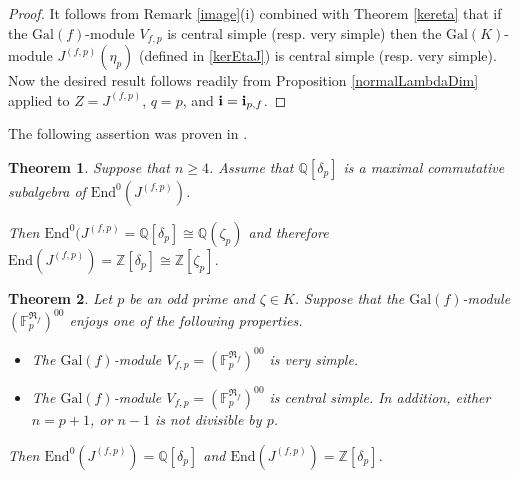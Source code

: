 \documentclass[12pt,a4paper,reqno]{amsart}
\def\Q{{\mathbb Q}}
\def\Z{{\mathbb Z}}
\def\R{{\mathbb R}}
\def\F{{\mathbb F}}
\def\R{{\mathfrak R}}
\def\CC{{\mathfrak C}}
\def\Gal{\mathrm{Gal}}
\def\Perm{\mathrm{Perm}}
\def\Alt{\mathrm{Alt}}
\def\End{\mathrm{End}}
\newtheorem{thm}{Theorem}[section]
\theoremstyle{definition}
\newtheorem{rem}[thm]{Remark}
\begin{document}
\begin{proof}
It follows from Remark \ref{image}(i) combined with Theorem \ref{kereta} that if the $\Gal(f)$-module  $V_{f,p}$ is central simple (resp. very simple) then
the $\Gal(K)$-module  $J^{(f,p)}(\eta_p)$  (defined in \eqref{kerEtaJ}) is central simple (resp. very simple). Now the desired result follows readily from
Proposition \ref{normalLambdaDim} applied to $Z=J^{(f,p)}$, $q=p$,  and ${\bf i}={\bf i}_{p,f}$.
\end{proof}
 







The following assertion was proven in \cite[Th. 3.6]{ZarhinCambridge}.


\begin{thm}
\label{Cambridge36}
Suppose that $n \ge 4$.  Assume that $\Q[\delta_p]$ is a maximal commutative subalgebra of
 $\End^0(J^{(f,p)})$. 
 
 Then  $\End^0(J^{(f,p)}=\Q[\delta_p]\cong \Q(\zeta_p)$ and therefore
 $\End(J^{(f,p)})=\Z[\delta_p]\cong \Z[\zeta_p]$.
\end{thm}






\begin{thm}
\label{handysup} Let $p$ be an odd prime and $\zeta \in K$. 
Suppose that the $\Gal(f)$-module $(\F_p^{\R_f})^{00}$
enjoys one of the following properties.

 
\begin{itemize}
\item[(i)]
The $\Gal(f)$-module $V_{f,p}=(\F_p^{\R_f})^{00}$  is very simple.
\item[(ii)]
The  $\Gal(f)$-module 
$V_{f,p}=(\F_p^{\R_f})^{00}$ is central simple.  In addition, 
either $n=p+1$, or $n-1$ is not divisible by $p$. 
\end{itemize}

  Then $\End^0(J^{(f,p)})=\Q[\delta_p]$ and $\End(J^{(f,p)})=\Z[\delta_p]$.

\end{thm}
\end{document}
